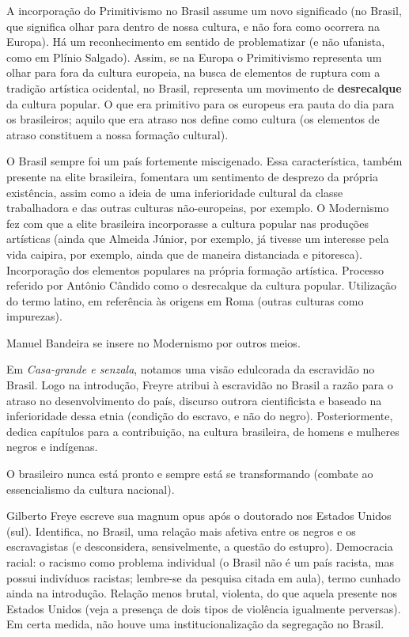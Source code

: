 A incorporação do Primitivismo no Brasil assume um novo significado (no Brasil, que significa olhar para dentro de nossa cultura, e não fora como ocorrera na Europa). Há um reconhecimento em sentido de problematizar (e não ufanista, como em Plínio Salgado). Assim, se na Europa o Primitivismo representa um olhar para fora da cultura europeia, na busca de elementos de ruptura com a tradição artística ocidental, no Brasil, representa um movimento de \textbf{desrecalque} da cultura popular. O que era primitivo para os europeus era pauta do dia para os brasileiros; aquilo que era atraso nos define como cultura (os elementos de atraso constituem a nossa formação cultural).

O Brasil sempre foi um país fortemente miscigenado. Essa característica, também presente na elite brasileira, fomentara um sentimento de desprezo da própria existência, assim como a ideia de uma inferioridade cultural da classe trabalhadora e das outras culturas não-europeias, por exemplo. O Modernismo fez com que a elite brasileira incorporasse a cultura popular nas produções artísticas (ainda que Almeida Júnior, por exemplo, já tivesse um interesse pela vida caipira, por exemplo, ainda que de maneira distanciada e pitoresca). Incorporação dos elementos populares na própria formação artística. Processo referido por Antônio Cândido como o desrecalque da cultura popular. Utilização do termo latino, em referência às origens em Roma (outras culturas como impurezas).

Manuel Bandeira se insere no Modernismo por outros meios.

Em \textit{Casa-grande e senzala}, notamos uma visão edulcorada da escravidão no Brasil. Logo na introdução, Freyre atribui à escravidão no Brasil a razão para o atraso no desenvolvimento do país, discurso outrora cientificista e baseado na inferioridade dessa etnia (condição do escravo, e não do negro). Posteriormente, dedica capítulos para a contribuição, na cultura brasileira, de homens e mulheres negros e indígenas.

O brasileiro nunca está pronto e sempre está se transformando (combate ao essencialismo da cultura nacional).

Gilberto Freye escreve sua magnum opus após o doutorado nos Estados Unidos (sul). Identifica, no Brasil, uma relação mais afetiva entre os negros e os escravagistas (e desconsidera, sensivelmente, a questão do estupro). Democracia racial: o racismo como problema individual (o Brasil não é um país racista, mas possui indivíduos racistas; lembre-se da pesquisa citada em aula), termo cunhado ainda na introdução. Relação menos brutal, violenta, do que aquela presente nos Estados Unidos (veja a presença de dois tipos de violência igualmente perversas). Em certa medida, não houve uma institucionalização da segregação no Brasil.

